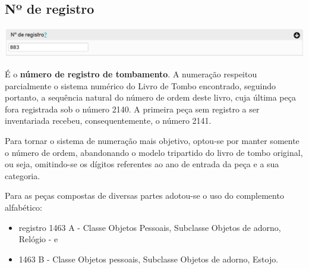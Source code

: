 \subsection{Nº de registro}
\begin{flushleft}
	\includegraphics[width=\linewidth]{elemento-01}
\end{flushleft}
É o \textbf{número de registro de tombamento}. A numeração respeitou parcialmente o sistema numérico do Livro de Tombo encontrado, seguindo portanto, a sequência natural do número de ordem deste livro, cuja última peça fora registrada sob o número 2140. A primeira peça sem registro a ser inventariada recebeu, consequentemente, o número 2141.

Para tornar o sistema de numeração mais objetivo, optou-se por manter somente o número de ordem, abandonando o modelo tripartido do livro de tombo original, ou seja, omitindo-se os dígitos referentes ao ano de entrada da peça e a sua categoria. 

Para as peças compostas de diversas partes adotou-se o uso do complemento alfabético:

\begin{itemize}
	\item registro 1463 A - Classe Objetos Pessoais, Subclasse Objetos de adorno, Relógio - e 
	\item 1463 B - Classe Objetos pessoais, Subclasse Objetos de adorno, Estojo.
\end{itemize}

